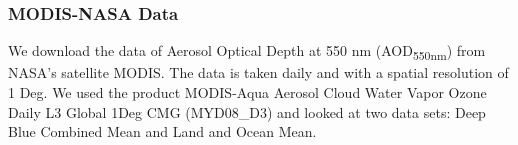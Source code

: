 \subsubsection{MODIS-NASA Data}
We download the data of Aerosol Optical Depth at 550 nm (AOD\textsubscript{550nm}) from NASA’s satellite MODIS. The data is taken daily and with a spatial resolution of 1 Deg. We used the product MODIS-Aqua Aerosol Cloud Water Vapor Ozone Daily L3 Global 1Deg CMG (MYD08\_D3) and looked at two data sets: Deep Blue Combined Mean and Land and Ocean Mean.\cite{MODIS_AOD}